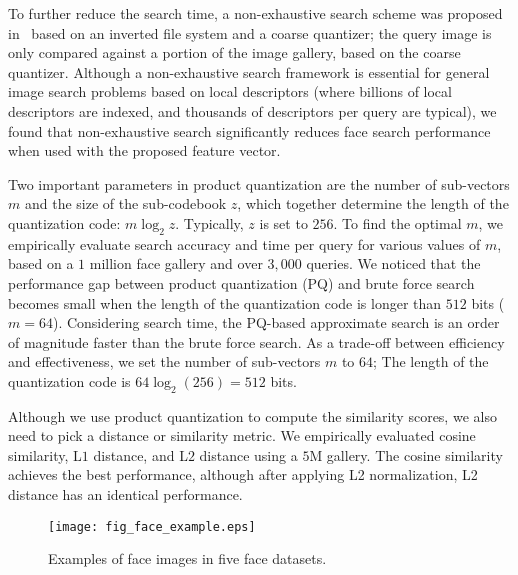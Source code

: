 \documentclass[10pt,journal,compsoc]{IEEEtran}
\begin{document}
To further reduce the search time, a non-exhaustive search scheme was proposed in~\cite{retrieval:pq, retrieval:lopq} based on an inverted file system and a coarse quantizer; the query image is only compared against a portion of the image gallery, based on the coarse quantizer. Although a non-exhaustive search framework is essential for general image search problems based on local descriptors (where billions of local descriptors are indexed, and thousands of descriptors per query are typical), we found that non-exhaustive search significantly reduces face search performance when used with the proposed  feature vector.


Two important parameters in product quantization are the number of sub-vectors $m$ and the size of the sub-codebook $z$, which together determine the length of the quantization code: $m\log_2{z}$. Typically, $z$ is set to $256$. To find the optimal $m$, we empirically evaluate search accuracy and time per query for various values of $m$, based on a $1$ million face gallery and over $3,000$ queries.
We noticed that the performance gap between product quantization (PQ) and brute force search becomes small when the length of the quantization code is longer than $512$ bits ($m=64$). Considering search time, the PQ-based approximate search is an order of magnitude faster than the brute force search. As a trade-off between efficiency and effectiveness, we set the number of sub-vectors $m$ to $64$; The length of the quantization code is $64 \log_2(256) = 512$ bits.

Although we use product quantization to compute the similarity scores, we also need to pick a distance or similarity metric. We empirically evaluated cosine similarity, L$1$ distance, and L$2$ distance using a $5$M gallery. The cosine similarity achieves the best performance, although after applying L2 normalization, L2 distance has an identical performance.

\begin{figure*}[htbp]
\centering
  \texttt{[image: fig\_face\_example.eps]}\\
  \caption{Examples of face images in five face datasets.}\label{fig:example_web}
\end{figure*}
\end{document}
